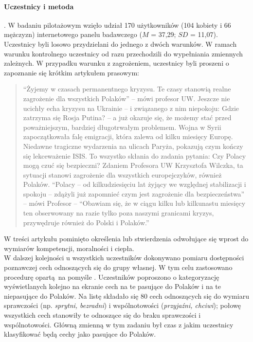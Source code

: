 \documentclass[man]{apa6}
\begin{document}
\paragraph{Uczestnicy i metoda}.
W badaniu pilotażowym wzięło udział 170 użytkowników (104 kobiety i 66 mężczyzn) internetowego panelu badawczego ($M$ = 37,29; $SD$ = 11,07).\\
Uczestnicy byli losowo przydzielani do jednego z dwóch warunków. W ramach warunku kontrolnego uczestnicy od razu przechodzili do wypełniania zmiennych zależnych. W przypadku warunku z zagrożeniem, uczestnicy byli proszeni o zapoznanie się krótkim artykułem prasowym:
\blockquote{``Żyjemy w czasach permanentnego kryzysu. Te czasy stanowią realne zagrożenie dla wszystkich Polaków'' -- mówi profesor UW. Jeszcze nie ucichły echa kryzysu na Ukrainie -- i związanego z nim niepokoju: Gdzie zatrzyma się Rosja Putina? -- a już okazuje się, że możemy stać przed poważniejszym, bardziej długotrwałym problemem. Wojna w Syrii zapoczątkowała falę emigracji, która zalewa od kilku miesięcy Europę. Niedawne tragiczne wydarzenia na ulicach Paryża, pokazują czym kończy się lekceważenie ISIS. To wszystko skłania do zadania pytania: Czy Polacy mogą czuć się bezpieczni? Zdaniem Profesora UW Krzysztofa Wilczka, ta sytuacji stanowi zagrożenie dla wszystkich europejczyków, również Polaków. ``Polacy -- od kilkudziesięciu lat żyjący we względnej stabilizacji i spokoju -- zdążyli już zapomnieć czym jest zagrożenie dla bezpieczeństwa'' -- mówi Profesor -- ``Obawiam się, że w ciągu kilku lub kilkunastu miesięcy ten obserwowany na razie tylko poza naszymi granicami kryzys, przywędruje również do Polski i Polaków.''}

W treści artykułu pominięto określenia lub stwierdzenia odwołujące się wprost do wymiarów kompetencji, moralności i ciepła.\\

W dalszej kolejności u wszystkich uczestników dokonywano pomiaru dostępności poznawczej cech odnoszących się do grupy własnej. W tym celu zastosowano procedurę opartą na pomyśle \textcite{dodgson1998self}. Uczestników poproszono o kategoryzację wyświetlanych kolejno na ekranie cech na te pasujące do Polaków i na te niepasujące do Polaków. Na listę składało się 80 cech odnoszących się do wymiaru sprawczości (np. \emph{sprytni, bezradni}) i wspólnotowości (\emph{przyjaźni, chciwi}); połowę wszystkich cech stanowiły te odnoszące się do braku sprawczości i wspólnotowości. Główną zmienną w tym zadaniu był czas z jakim uczestnicy klasyfikować będą cechy jako pasujące do Polaków.
\end{document}
